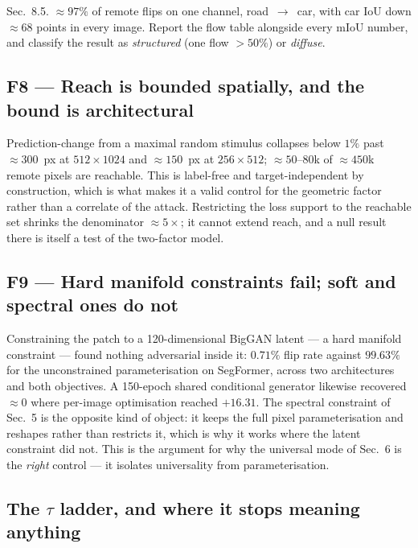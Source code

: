 \documentclass[11pt,a4paper]{article}
\begin{document}
Sec.~8.5. $\approx97\%$ of remote flips on one channel, road~$\to$~car, with
car IoU down $\approx68$ points in every image. Report the flow table
alongside every mIoU number, and classify the result as \emph{structured}
(one flow $>50\%$) or \emph{diffuse}.

\subsection{F8 --- Reach is bounded spatially, and the bound is
architectural}

Prediction-change from a maximal random stimulus collapses below $1\%$ past
$\approx300$~px at $512\times1024$ and $\approx150$~px at $256\times512$;
$\approx50$--$80$k of $\approx450$k remote pixels are reachable. This is
label-free and target-independent by construction, which is what makes it a
valid control for the geometric factor rather than a correlate of the
attack. Restricting the loss support to the reachable set shrinks the
denominator $\approx5\times$; it cannot extend reach, and a null result
there is itself a test of the two-factor model.

\subsection{F9 --- Hard manifold constraints fail; soft and spectral ones
do not}

Constraining the patch to a 120-dimensional BigGAN latent --- a hard
manifold constraint --- found nothing adversarial inside it: $0.71\%$ flip
rate against $99.63\%$ for the unconstrained parameterisation on SegFormer,
across two architectures and both objectives. A 150-epoch shared conditional
generator likewise recovered $\approx0$ where per-image optimisation reached
$+16.31$. The spectral constraint of Sec.~5 is the opposite kind of object:
it keeps the full pixel parameterisation and reshapes rather than restricts
it, which is why it works where the latent constraint did not. This is the
argument for why the universal mode of Sec.~6 is the \emph{right} control
--- it isolates universality from parameterisation.

\subsection{The $\tau$ ladder, and where it stops meaning anything}
\end{document}
